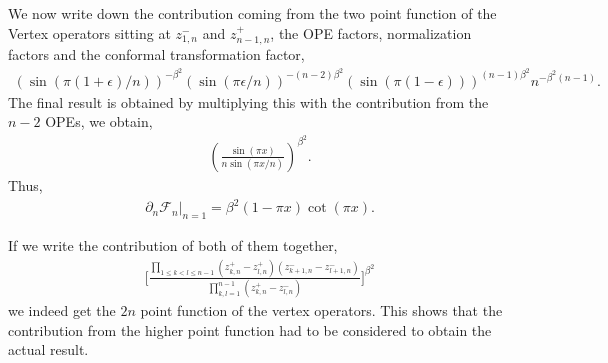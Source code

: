 \documentclass[11pt]{article}
\newcommand{\ep}{\epsilon}
\newcommand{\p}{\partial}
\newcommand{\lb}{\left(}
\newcommand{\rb}{\right)}
\begin{document}
We now write down the contribution coming from the two point function of the Vertex operators sitting at $z_{1,n}^-$ and $z_{n-1,n}^+$, the OPE factors, normalization factors and the conformal transformation factor,
\begin{align}
    \lb\sin(\pi(1+\ep)/n)\rb^{-\beta^2} \lb \sin(\pi \ep/n) \rb^{-(n-2)\beta^2}(\sin(\pi(1-\ep)))^{(n-1)\beta^2} n^{-\beta^2(n-1)}.
\end{align}
The final result is obtained by multiplying this with the contribution from the $n-2$ OPEs, we obtain,
\begin{align}
    \lb\frac{\sin(\pi x)}{n\sin(\pi x/n)}\rb^{\beta^2}.
\end{align}
Thus,
\begin{align}
    \p_n\mathcal{F}_n|_{n=1} = \beta^2 (1-\pi x)\cot(\pi x).
\end{align}


If we write the contribution of both of them together,
\begin{align}
    \Bigg[\frac{\prod_{1\leq k < l \leq n-1}(z_{k,n}^+ - z_{l,n}^+)(z_{k+1,n}^- - z_{l+1,n}^-)}{\prod_{k,l=1}^{n-1}(z_{k,n}^+ - z_{l,n}^-)}\Bigg]^{\beta^2}
\end{align}
we indeed get the $2n$ point function of the vertex operators. This shows that the contribution from the higher point function had to be considered to obtain the actual result.

\end{document}
